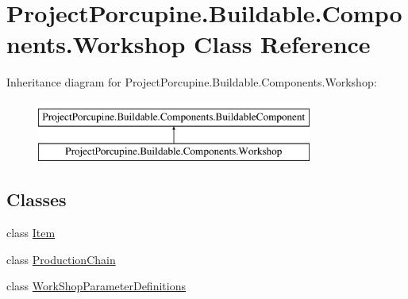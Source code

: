 \hypertarget{class_project_porcupine_1_1_buildable_1_1_components_1_1_workshop}{}\section{Project\+Porcupine.\+Buildable.\+Components.\+Workshop Class Reference}
\label{class_project_porcupine_1_1_buildable_1_1_components_1_1_workshop}
Inheritance diagram for Project\+Porcupine.\+Buildable.\+Components.\+Workshop\+:\begin{figure}[H]
\begin{center}
\leavevmode
\includegraphics[height=2.000000cm]{class_project_porcupine_1_1_buildable_1_1_components_1_1_workshop}
\end{center}
\end{figure}
\subsection*{Classes}
\begin{DoxyCompactItemize}
\item 
class \hyperlink{class_project_porcupine_1_1_buildable_1_1_components_1_1_workshop_1_1_item}{Item}
\item 
class \hyperlink{class_project_porcupine_1_1_buildable_1_1_components_1_1_workshop_1_1_production_chain}{Production\+Chain}
\item 
class \hyperlink{class_project_porcupine_1_1_buildable_1_1_components_1_1_workshop_1_1_work_shop_parameter_definitions}{Work\+Shop\+Parameter\+Definitions}
\end{DoxyCompactItemize}
